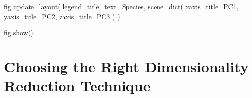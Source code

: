\documentclass[
  letterpaper,
  DIV=11,
  numbers=noendperiod]{scrreprt}
\newenvironment{Shaded}{\begin{snugshade}}{\end{snugshade}}
\newcommand{\BuiltInTok}[1]{\textcolor[rgb]{0.00,0.23,0.31}{#1}}
\newcommand{\NormalTok}[1]{\textcolor[rgb]{0.00,0.23,0.31}{#1}}
\newcommand{\OperatorTok}[1]{\textcolor[rgb]{0.37,0.37,0.37}{#1}}
\newcommand{\StringTok}[1]{\textcolor[rgb]{0.13,0.47,0.30}{#1}}
\begin{document}
\begin{Shaded}
\begin{Highlighting}[]
\NormalTok{fig.update\_layout(}
\NormalTok{    legend\_title\_text}\OperatorTok{=}\StringTok{\textquotesingle{}Species\textquotesingle{}}\NormalTok{,}
\NormalTok{    scene}\OperatorTok{=}\BuiltInTok{dict}\NormalTok{(}
\NormalTok{        xaxis\_title}\OperatorTok{=}\StringTok{\textquotesingle{}PC1\textquotesingle{}}\NormalTok{,}
\NormalTok{        yaxis\_title}\OperatorTok{=}\StringTok{\textquotesingle{}PC2\textquotesingle{}}\NormalTok{,}
\NormalTok{        zaxis\_title}\OperatorTok{=}\StringTok{\textquotesingle{}PC3\textquotesingle{}}
\NormalTok{    )}
\NormalTok{)}

\NormalTok{fig.show()}
\end{Highlighting}
\end{Shaded}

\begin{figure}


\caption{\label{fig-3d-pca}}

\end{figure}%

\section{Choosing the Right Dimensionality Reduction
Technique}\label{choosing-the-right-dimensionality-reduction-technique}
\end{document}
